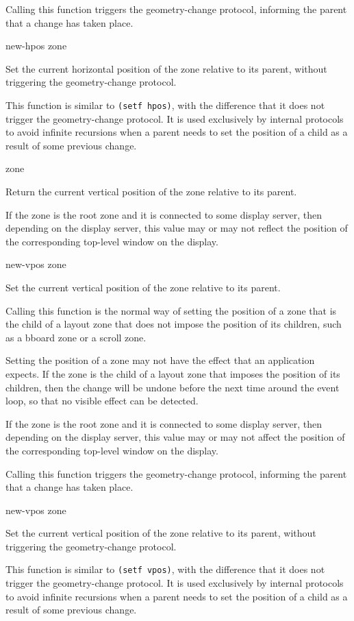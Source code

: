 Calling this function triggers the geometry-change protocol,
informing the parent that a change has taken place.  

 {new-hpos zone}

Set the current horizontal position of the zone relative to its
parent, without triggering the geometry-change protocol.

This function is similar to \texttt{(setf hpos)}, with the difference
that it does not trigger the geometry-change protocol.  It is used
exclusively by internal protocols to avoid infinite recursions when a
parent needs to set the position of a child as a result of some
previous change.

 {zone}

Return the current vertical position of the zone relative to its
parent.  

If the zone is the root zone and it is connected to some display
server, then depending on the display server, this value may or
may not reflect the position of the corresponding top-level window
on the display.

 {new-vpos zone}

Set the current vertical position of the zone relative to its
parent.

Calling this function is the normal way of setting the position of
a zone that is the child of a layout zone that does not impose the
position of its children, such as a bboard zone or a scroll
zone.

Setting the position of a zone may not have the effect that an
application expects.  If the zone is the child of a layout zone
that imposes the position of its children, then the change will be
undone before the next time around the event loop, so that no
visible effect can be detected.  

If the zone is the root zone and it is connected to some display
server, then depending on the display server, this value may or
may not affect the position of the corresponding top-level window
on the display.

Calling this function triggers the geometry-change protocol,
informing the parent that a change has taken place.  

 {new-vpos zone}

Set the current vertical position of the zone relative to its
parent, without triggering the geometry-change protocol.

This function is similar to \texttt{(setf vpos)}, with the difference
that it does not trigger the geometry-change protocol.  It is used
exclusively by internal protocols to avoid infinite recursions when a
parent needs to set the position of a child as a result of some
previous change.

